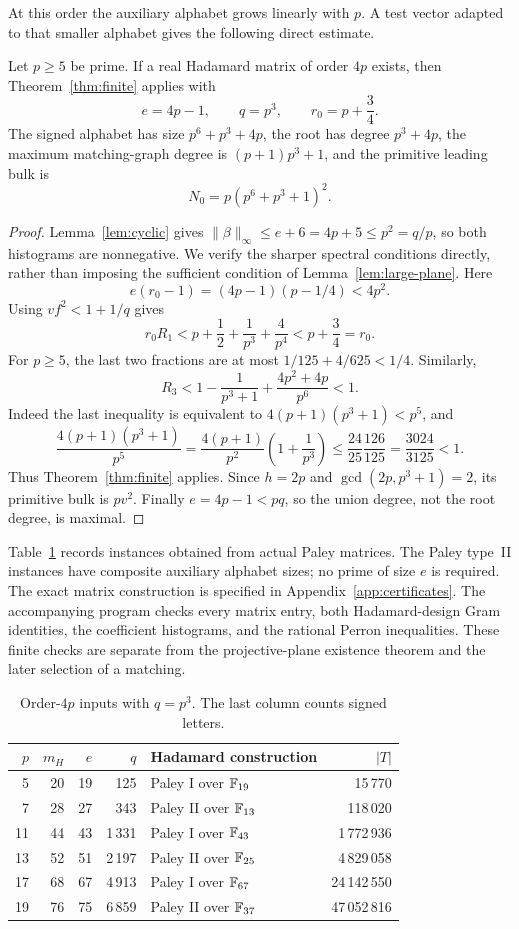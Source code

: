 At this order the auxiliary alphabet grows linearly with $p$. A test vector adapted to that smaller alphabet gives the following direct estimate.
\begin{theorem}\label{thm:4p}
Let $p\ge5$ be prime. If a real Hadamard matrix of order $4p$ exists, then Theorem~\ref{thm:finite} applies with
\[
 e=4p-1,\qquad q=p^3,\qquad r_0=p+\frac34.
\]
The signed alphabet has size $p^6+p^3+4p$, the root has degree $p^3+4p$, the maximum matching-graph degree is $(p+1)p^3+1$, and the primitive leading bulk is
\[
 N_0=p(p^6+p^3+1)^2.
\]
\end{theorem}
\begin{proof}
Lemma~\ref{lem:cyclic} gives $\|\beta\|_\infty\le e+6=4p+5\le p^2=q/p$, so both histograms are nonnegative. We verify the sharper spectral conditions directly, rather than imposing the sufficient condition of Lemma~\ref{lem:large-plane}. Here
\[
 e(r_0-1)=(4p-1)(p-1/4)<4p^2.
\]
Using $vf^2<1+1/q$ gives
\[
 r_0R_1<p+\frac12+\frac1{p^3}+\frac4{p^4}<p+\frac34=r_0.
\]
For $p\ge5$, the last two fractions are at most $1/125+4/625<1/4$. Similarly,
\[
 R_3<1-\frac1{p^3+1}+\frac{4p^2+4p}{p^6}<1.
\]
Indeed the last inequality is equivalent to $4(p+1)(p^3+1)<p^5$, and
\[
 \frac{4(p+1)(p^3+1)}{p^5}
 =\frac{4(p+1)}{p^2}\left(1+\frac1{p^3}\right)
 \le\frac{24}{25}\frac{126}{125}=\frac{3024}{3125}<1.
\]
Thus Theorem~\ref{thm:finite} applies. Since $h=2p$ and $\gcd(2p,p^3+1)=2$, its primitive bulk is $pv^2$. Finally $e=4p-1<pq$, so the union degree, not the root degree, is maximal.
\end{proof}

Table~\ref{tab:small-primes} records instances obtained from actual Paley matrices. The Paley type~II instances have composite auxiliary alphabet sizes; no prime of size $e$ is required. The exact matrix construction is specified in Appendix~\ref{app:certificates}. The accompanying program checks every matrix entry, both Hadamard-design Gram identities, the coefficient histograms, and the rational Perron inequalities. These finite checks are separate from the projective-plane existence theorem and the later selection of a matching.
\begin{table}[htbp]
\centering
\caption{Order-$4p$ inputs with $q=p^3$. The last column counts signed letters.}\label{tab:small-primes}
\begin{tabular}{rrrrlr}
\toprule
$p$&$m_H$&$e$&$q$&Hadamard construction&$|T|$\\
\midrule
5&20&19&125&Paley I over $\mathbb F_{19}$&15\,770\\
7&28&27&343&Paley II over $\mathbb F_{13}$&118\,020\\
11&44&43&1\,331&Paley I over $\mathbb F_{43}$&1\,772\,936\\
13&52&51&2\,197&Paley II over $\mathbb F_{25}$&4\,829\,058\\
17&68&67&4\,913&Paley I over $\mathbb F_{67}$&24\,142\,550\\
19&76&75&6\,859&Paley II over $\mathbb F_{37}$&47\,052\,816\\
\bottomrule
\end{tabular}
\end{table}

